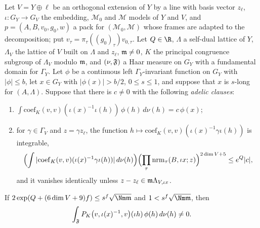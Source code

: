 \begin{lemma}\label{pf:fs:idDom}
Let $V=Y\oplus\ell$ be an orthogonal extension of $Y$ by a line with basis vector $z_\ell$, $\iota\colon G_Y\to G_V$ the embedding, $\mathcal M_0$ and
$\mathcal M$ models of $Y$ and $V$, and $p=(A,B,v_0,g_0,w)$ a pack for $(\mathcal M_0,\mathcal M)$ whose frames are adapted to the decomposition;
put $v_\tau=\pi_\tau((g_0)_\tau)v_{0,\tau}$. Let $Q\in\R$, $\Lambda$ a self-dual lattice of $Y$, $\Lambda_V$ the lattice of $V$ built on $\Lambda$ and
$z_\ell$, $\mathfrak m\ne0$, $K$ the principal congruence subgroup of $\Lambda_V$ modulo $\mathfrak m$, and $(\nu,\mathfrak F)$ a Haar measure on $G_Y$ with a
fundamental domain for $\Gamma_Y$. Let $\phi$ be a continuous left $\Gamma_Y$-invariant function on $G_Y$ with $|\phi|\le b$, let $x\in G_Y$ with
$|\phi(x)|>b/2$, $0\le s\le1$, and suppose that $x$ is $s$-long for $(A,\Lambda)$. Suppose that there is $c\ne0$ with the following
\emph{adelic clauses}:
\begin{enumerate}[label=(A\arabic*)]
\item $\int\mathrm{coef}_K(v,v)(\iota(x)^{-1}\iota(h))\,\phi(h)\,d\nu(h)=c\,\phi(x)$;
\item for $\gamma\in\Gamma_V$ and $z=\gamma z_\ell$, the function $h\mapsto\mathrm{coef}_K(v,v)(\iota(x)^{-1}\gamma\iota(h))$ is integrable,
\[
\Bigl(\int|\mathrm{coef}_K(v,v)(\iota(x)^{-1}\gamma\iota(h))|\,d\nu(h)\Bigr)\Bigl(\prod_\tau\mathrm{nrm}_\tau(B,\iota x;z)\Bigr)^{2\dim V+5}\le e^Q|c|,
\]
and it vanishes identically unless $z-z_\ell\in\mathfrak m\Lambda_{V,\iota x}$.
\end{enumerate}
If $2\exp(Q+(6\dim V+9)f)\le s^f\sqrt{\Nm\fsm}$ and $1<s^f\sqrt{\Nm\fsm}$, then
\[
\int_{\mathfrak F}P_K\bigl(v,\iota(x)^{-1},v\bigr)(\iota h)\,\phi(h)\,d\nu(h)\neq0 .
\]
\end{lemma}

